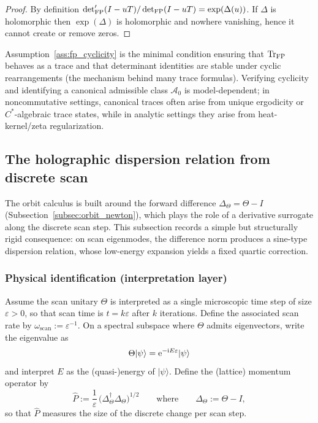 \begin{proof}
By definition $\det'_{\mathrm{FP}}(I-uT)/\det_{\mathrm{FP}}(I-uT)=\exp(\Delta(u))$. If $\Delta$ is holomorphic then $\exp(\Delta)$ is holomorphic and nowhere vanishing, hence it cannot create or remove zeros.
\end{proof}

\begin{remark}
Assumption~\ref{ass:fp_cyclicity} is the minimal condition ensuring that $\mathrm{Tr}_{\mathrm{FP}}$ behaves as a trace and that determinant identities are stable under cyclic rearrangements (the mechanism behind many trace formulas). Verifying cyclicity and identifying a canonical admissible class $\mathcal{A}_0$ is model-dependent; in noncommutative settings, canonical traces often arise from unique ergodicity or $C^*$-algebraic trace states, while in analytic settings they arise from heat-kernel/zeta regularization.
\end{remark}

\subsection{The holographic dispersion relation from discrete scan}
\label{subsec:holographic_dispersion}
The orbit calculus is built around the forward difference $\Delta_\Theta=\Theta-I$ (Subsection~\ref{subsec:orbit_newton}), which plays the role of a derivative surrogate along the discrete scan step.
This subsection records a simple but structurally rigid consequence: on scan eigenmodes, the difference norm produces a sine-type dispersion relation, whose low-energy expansion yields a fixed quartic correction.

\subsubsection{Physical identification (interpretation layer)}
\begin{assumption}
\label{assump:energy_momentum_from_scan}
Assume the scan unitary $\Theta$ is interpreted as a single microscopic time step of size $\varepsilon>0$, so that scan time is $t=k\varepsilon$ after $k$ iterations. Define the associated scan rate by $\omega_{\mathrm{scan}}:=\varepsilon^{-1}$.
On a spectral subspace where $\Theta$ admits eigenvectors, write the eigenvalue as
$$
\Theta|\psi\rangle=\mathrm{e}^{-\mathrm{i} E\varepsilon}|\psi\rangle
$$
and interpret $E$ as the (quasi-)energy of $|\psi\rangle$.
Define the (lattice) momentum operator by
$$
\widehat{P}:=\frac{1}{\varepsilon}\,\big(\Delta_\Theta^\dagger\Delta_\Theta\big)^{1/2}
\qquad\text{where}\qquad
\Delta_\Theta:=\Theta-I,
$$
so that $\widehat{P}$ measures the size of the discrete change per scan step.
\end{assumption}

